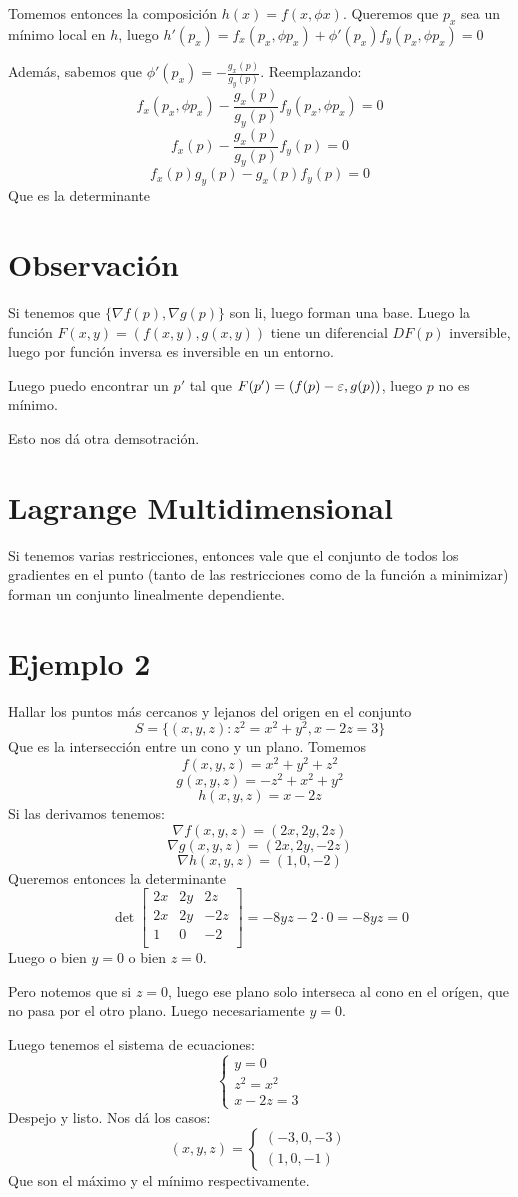 \documentclass{article}
\begin{document}
Tomemos entonces la composición $h(x) = f(x, \phi x)$. Queremos que $p_x$ sea un mínimo local en $h$, luego $h'(p_x) = f_x(p_x, \phi p_x) + \phi'(p_x) f_y(p_x, \phi p_x) = 0$

Además, sabemos que $\phi'(p_x) = -\frac{g_x(p)}{g_y(p)} $. Reemplazando:
\[
	f_x(p_x, \phi p_x) - \frac{g_x(p)}{g_y(p)}  f_y(p_x, \phi p_x) = 0
\]
\[
	f_x(p) - \frac{g_x(p)}{g_y(p)}  f_y(p) = 0
\]
\[
	f_x(p)g_y(p) - g_x(p) f_y(p) = 0
\]
Que es la determinante

\section*{Observación}
Si tenemos que $\{ \nabla f(p), \nabla g(p) \}$ son li, luego forman una base. Luego la función $F(x,y) = (f(x,y), g(x,y))$ tiene un diferencial $DF(p)$ inversible, luego por función inversa es inversible en un entorno.

Luego puedo encontrar un $p'$ tal que $F(p') = (f(p) - \varepsilon, g(p))$, luego $p$ no es mínimo.

Esto nos dá otra demsotración.

\section*{Lagrange Multidimensional}
Si tenemos varias restricciones, entonces vale que el conjunto de todos los gradientes en el punto (tanto de las restricciones como de la función a minimizar) forman un conjunto linealmente dependiente.

\section*{Ejemplo 2}
Hallar los puntos más cercanos y lejanos del origen en el conjunto
\[S = \{(x,y,z) : z^2 = x^2 + y^2, x-2z = 3\}\]
Que es la intersección entre un cono y un plano.
Tomemos
\[f(x,y,z) = x^2 + y^2 + z^2\]
\[g(x,y,z) = -z^2 + x^2 + y^2\]
\[h(x,y,z) = x - 2z\]
Si las derivamos tenemos:
\[\nabla f(x,y,z) = (2x, 2y, 2z)\]
\[\nabla g(x,y,z) = (2x, 2y, -2z)\]
\[\nabla h(x,y,z) = (1, 0, -2)\]
Queremos entonces la determinante
\[
	\det \begin{bmatrix}
		2x & 2y & 2z \\
		2x & 2y & -2z \\
		1 & 0 & -2 \\
	\end{bmatrix} = -8yz - 2 \cdot 0 = -8yz = 0
\]
Luego o bien $y = 0$ o bien $z = 0$.

Pero notemos que si $z = 0$, luego ese plano solo interseca al cono en el orígen, que no pasa por el otro plano. Luego necesariamente $y = 0$.

Luego tenemos el sistema de ecuaciones:
\[
	\begin{cases}
		y = 0 \\
		z^2 = x^2 \\
		x - 2z = 3
	\end{cases}
\]
Despejo y listo. Nos dá los casos:
\[
	(x,y,z) = \begin{cases}
	(-3, 0, -3) \\
	(1, 0, -1)
	\end{cases}
\]
Que son el máximo y el mínimo respectivamente.
\end{document}
